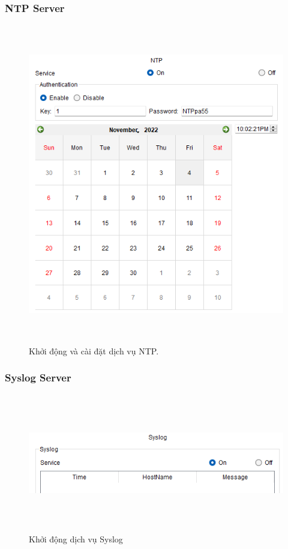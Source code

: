 \documentclass[a4paper, 12pt]{article}
\begin{document}
\subsubsection{NTP Server}
\begin{figure}[H]
    \centering
    \includegraphics[width=16cm, height=14cm]{img/4.2.6.png}
    \caption{ Khởi động và cài đặt dịch vụ NTP.}
    \label{hinh426}
\end{figure}
\subsubsection{Syslog Server }
\begin{figure}[H]
    \centering
    \includegraphics[width=16cm, height=6cm]{img/4.2.7.png}
    \caption{ Khởi động dịch vụ Syslog}
    \label{hinh427}
\end{figure}
\end{document}
